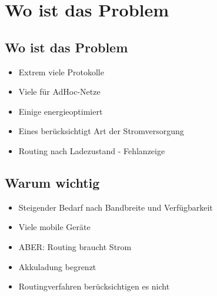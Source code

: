 \documentclass[11pt,landscape]{beamer}
\begin{document}

\section{Wo ist das Problem}

\subsection{Wo ist das Problem}

\begin{frame}{\insertsubsection}
\begin{itemize}
\item Extrem viele Protokolle\newline
\item Viele für AdHoc-Netze\newline
\item Einige energieoptimiert\newline
\item Eines berücksichtigt Art der Stromversorgung\newline
\item Routing nach Ladezustand - Fehlanzeige
\end{itemize}
\end{frame}


\subsection{Warum wichtig}

\begin{frame}{\insertsubsection}
\begin{itemize}
\item Steigender Bedarf nach Bandbreite und Verfügbarkeit\newline
\item Viele mobile Geräte\newline
\item ABER: Routing braucht Strom\newline
\item Akkuladung begrenzt\newline
\item Routingverfahren berücksichtigen es nicht
\end{itemize}
\end{frame}
\end{document}
